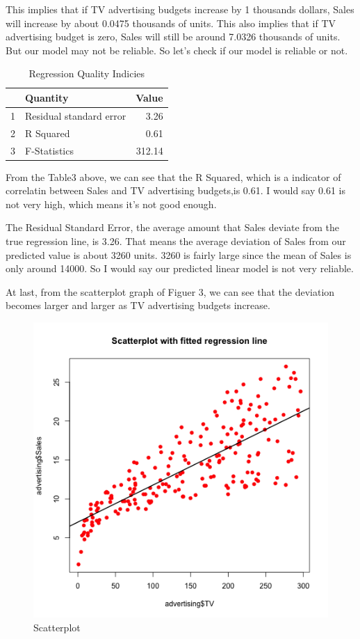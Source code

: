 \documentclass{article}
\begin{document}
\noindent
This implies that if TV advertising budgets increase by 1 thousands dollars, Sales will increase by about 0.0475 thousands of units. This also implies that if TV advertising budget is zero, Sales will still be around 7.0326 thousands of units. But our model may not be reliable. So let's check if our model is reliable or not.

\begin{table}[ht]
\centering
\begin{tabular}{rlr}
  \hline
 & Quantity & Value \\ 
  \hline
1 & Residual standard error & 3.26 \\ 
  2 & R Squared & 0.61 \\ 
  3 & F-Statistics & 312.14 \\ 
   \hline
\end{tabular}
\caption{Regression Quality Indicies} 
\end{table}\noindent
From the Table3 above, we can see that the R Squared, which is a indicator of correlatin between Sales and TV advertising budgets,is 0.61. I would say 0.61 is not very high, which means it's not good enough.\newline

\noindent
The Residual Standard Error, the average amount that Sales deviate from the true regression line, is 3.26. That means the average deviation of Sales from our predicted value is about 3260 units. 3260 is fairly large since the mean of Sales is only around 14000. So I would say our predicted linear model is not very reliable.\newline

\noindent
At last, from the scatterplot graph of Figuer 3, we can see that the deviation becomes larger and larger as TV advertising budgets increase.

\begin{figure}[H]
\centering
\includegraphics{../images/scatterplot-tv-sales.png}
\caption{\label{fig:scatter} Scatterplot}
\end{figure}
\end{document}
